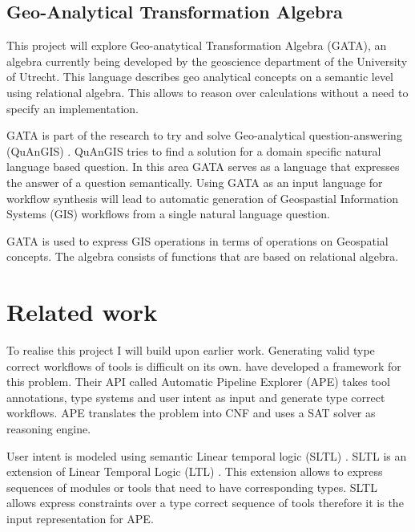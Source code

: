 \documentclass{article}
\begin{document}
\subsection{Geo-Analytical Transformation Algebra}
This project will explore Geo-anatytical Transformation Algebra (GATA), an algebra currently being developed by the geoscience department of the University of Utrecht.
This language describes geo analytical concepts on a semantic level using relational algebra. This allows to reason over calculations without a need to specify an implementation. 

GATA is part of the research to try and solve Geo-analytical question-answering (QuAnGIS) \cite{scheider2020geo}. QuAnGIS tries to find a solution for a domain specific natural language based question. In this area GATA serves as a language that expresses the answer of a question semantically. Using GATA as an input language for workflow synthesis will lead to automatic generation of Geospastial Information Systems (GIS) workflows from a single natural language question.

GATA is used to express GIS operations in terms of operations on Geospatial concepts. The algebra consists of functions that are based on relational algebra.  



\section{Related work }
To realise this project I will build upon earlier work. Generating valid type correct workflows of tools is difficult on its own. \cite{kasalica2020semantic} have developed a framework for this problem. Their API called Automatic Pipeline Explorer (APE) takes tool annotations, type systems and user intent as input and generate type correct workflows. APE translates the problem into CNF and uses a SAT solver as reasoning engine. 

User intent is modeled using semantic Linear temporal logic (SLTL) \cite{Steffen93moduleconfiguration}. SLTL is an extension of Linear Temporal Logic (LTL) \cite{emerson1990temporal}. This extension allows to express sequences of modules or tools that need to have corresponding types. SLTL allows express constraints over a type correct sequence of tools therefore it is the input representation for APE. 
\end{document}

